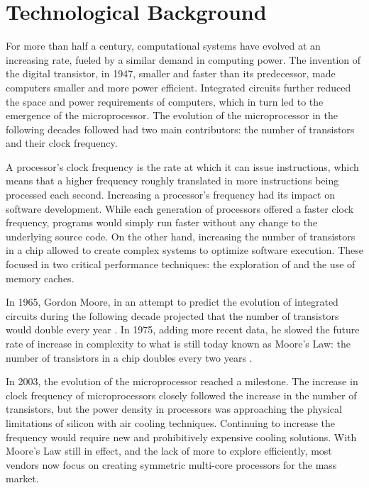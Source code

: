 \documentclass[../thesis]{subfiles}
\begin{document}
	\chapter{Technological Background}
	For more than half a century, computational systems have evolved at an increasing rate, fueled by a similar demand in computing power. The invention of the digital transistor, in 1947, smaller and faster than its predecessor, made computers smaller and more power efficient. Integrated circuits further reduced the space and power requirements of computers, which in turn led to the emergence of the microprocessor. The evolution of the microprocessor in the following decades followed had two main contributors: the number of transistors and their clock frequency.

	A processor's clock frequency is the rate at which it can issue instructions, which means that a higher frequency roughly translated in more instructions being processed each second. Increasing a processor's frequency had its impact on software development. While each generation of processors offered a faster clock frequency, programs would simply run faster without any change to the underlying source code. On the other hand, increasing the number of transistors in a chip allowed to create complex systems to optimize software execution. These focused in two critical performance techniques: the exploration of \ilp and the use of memory caches.

	In 1965, Gordon Moore, in an attempt to predict the evolution of integrated circuits during the following decade projected that the number of transistors would double every year \cite{Moore:1965}. In 1975, adding more recent data, he slowed the future rate of increase in complexity to what is still today known as Moore's Law: the number of transistors in a chip doubles every two years \cite{Moore:1975,ComputerHistory:Moore}.

	In 2003, the evolution of the microprocessor reached a milestone. The increase in clock frequency of microprocessors closely followed the increase in the number of transistors, but the power density in processors was approaching the physical limitations of silicon with air cooling techniques. Continuing to increase the frequency would require new and prohibitively expensive cooling solutions. With Moore's Law still in effect, and the lack of more \ilp to explore efficiently, most vendors now focus on creating symmetric multi-core processors for the mass market.
\end{document}
